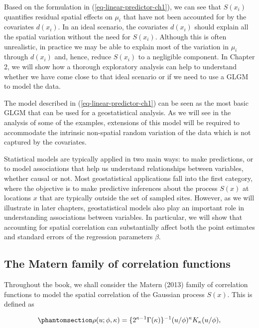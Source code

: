 \documentclass[
  letterpaper,
]{krantz}
\begin{document}
Based on the formulation in (\ref{eq-linear-predictor-ch1}), we can see
that \(S(x_i)\) quantifies residual spatial effects on \(\mu_i\) that
have not been accounted for by the covariates \(d(x_i)\). In an ideal
scenario, the covariates \(d(x_i)\) should explain all the spatial
variation without the need for \(S(x_i)\). Although this is often
unrealistic, in practice we may be able to explain most of the variation
in \(\mu_i\) through \(d(x_i)\) and, hence, reduce \(S(x_i)\) to a
negligible component. In Chapter 2, we will show how a thorough
exploratory analysis can help to understand whether we have come close
to that ideal scenario or if we need to use a GLGM to model the data.

The model described in (\ref{eq-linear-predictor-ch1}) can be seen as
the most basic GLGM that can be used for a geostatistical analysis. As
we will see in the analysis of some of the examples, extensions of this
model will be required to accommodate the intrinsic non-spatial random
variation of the data which is not captured by the covariates.

Statistical models are typically applied in two main ways: to make
predictions, or to model associations that help us understand
relationships between variables, whether causal or not. Most
geostatistical applications fall into the first category, where the
objective is to make predictive inferences about the process \(S(x)\) at
locations \(x\) that are typically outside the set of sampled sites.
However, as we will illustrate in later chapters, geostatistical models
also play an important role in understanding associations between
variables. In particular, we will show that accounting for spatial
correlation can substantially affect both the point estimates and
standard errors of the regression parameters \(\beta\).

\subsection{The Matern family of correlation
functions}\label{sec-matern-correlation}

Throughout the book, we shall consider the Matern (2013) family of
correlation functions to model the spatial correlation of the Gaussian
process \(S(x)\). This is defined as

\begin{equation}\phantomsection\label{eq-matern}{
\rho(u;\phi,\kappa) = \{2^{\kappa-1} \Gamma(\kappa)\}^{-1} (u/\phi)^\kappa K_\kappa(u/\phi),
}\end{equation}
\end{document}
